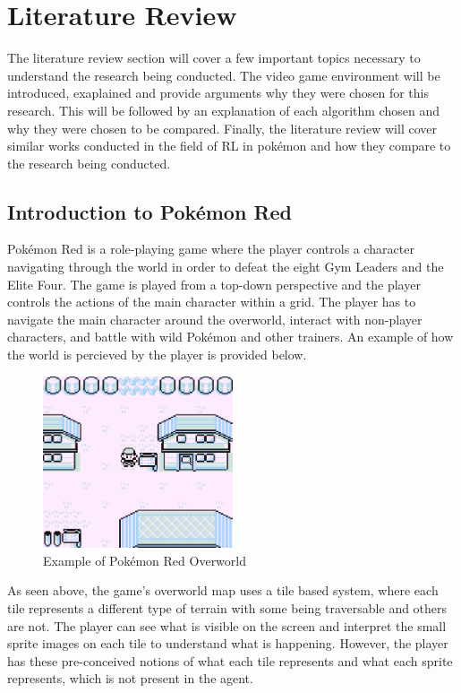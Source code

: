 \section{Literature Review}

The literature review section will cover a few important topics necessary to understand the research being conducted. The video game environment will be introduced, exaplained and provide arguments why they were chosen for this research. This will be followed by an explanation of each algorithm chosen and why they were chosen to be compared. Finally, the literature review will cover similar works conducted in the field of RL in pokémon and how they compare to the research being conducted.

\subsection{Introduction to Pokémon Red}

Pokémon Red is a role-playing game where the player controls a character navigating through the world in order to defeat the eight Gym Leaders and the Elite Four. The game is played from a top-down perspective and the player controls the actions of the main character within a grid. The player has to navigate the main character around the overworld, interact with non-player characters, and battle with wild Pokémon and other trainers. An example of how the world is percieved by the player is provided below\cite{HubZ_1998}. 

\begin{figure}[H]
    \centering
    \includegraphics[width=0.5\textwidth]{figures/red_pallet_town.png}
    \caption{Example of Pokémon Red Overworld}
    \label{fig:pkmn_overworld}
\end{figure}

As seen above, the game's overworld map uses a tile based system, where each tile represents a different type of terrain with some being traversable and others are not. The player can see what is visible on the screen and interpret the small sprite images on each tile to understand what is happening. However, the player has these pre-conceived notions of what each tile represents and what each sprite represents, which is not present in the agent\cite{HubZ_1998}. 

